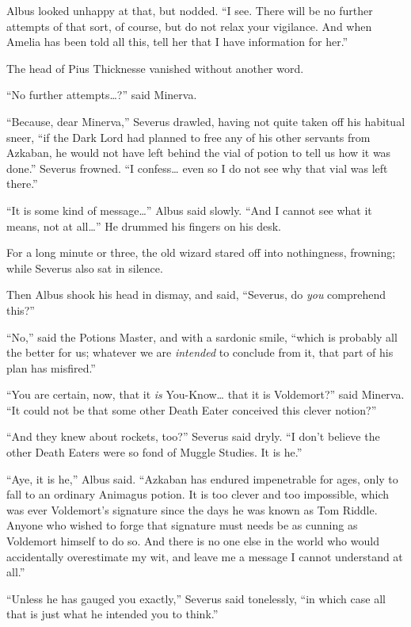 Albus looked unhappy at that, but nodded. ``I see. There will be no
further attempts of that sort, of course, but do not relax your
vigilance. And when Amelia has been told all this, tell her that I have
information for her.''

The head of Pius Thicknesse vanished without another word.

``No further attempts\ldots{}?'' said Minerva.

``Because, dear Minerva,'' Severus drawled, having not quite taken off
his habitual sneer, ``if the Dark Lord had planned to free any of his
other servants from Azkaban, he would not have left behind the vial of
potion to tell us how it was done.'' Severus frowned. ``I
confess\ldots{} even so I do not see why that vial was left there.''

``It is some kind of message\ldots{}'' Albus said slowly. ``And I cannot
see what it means, not at all\ldots{}'' He drummed his fingers on his
desk.

For a long minute or three, the old wizard stared off into nothingness,
frowning; while Severus also sat in silence.

Then Albus shook his head in dismay, and said, ``Severus, do \emph{you}
comprehend this?''

``No,'' said the Potions Master, and with a sardonic smile, ``which is
probably all the better for us; whatever we are \emph{intended} to
conclude from it, that part of his plan has misfired.''

``You are certain, now, that it \emph{is} You-Know\ldots{} that it is
Voldemort?'' said Minerva. ``It could not be that some other Death Eater
conceived this clever notion?''

``And they knew about rockets, too?'' Severus said dryly. ``I don't
believe the other Death Eaters were so fond of Muggle Studies. It is
he.''

``Aye, it is he,'' Albus said. ``Azkaban has endured impenetrable for
ages, only to fall to an ordinary Animagus potion. It is too clever and
too impossible, which was ever Voldemort's signature since the days he
was known as Tom Riddle. Anyone who wished to forge that signature must
needs be as cunning as Voldemort himself to do so. And there is no one
else in the world who would accidentally overestimate my wit, and leave
me a message I cannot understand at all.''

``Unless he has gauged you exactly,'' Severus said tonelessly, ``in
which case all that is just what he intended you to think.''

